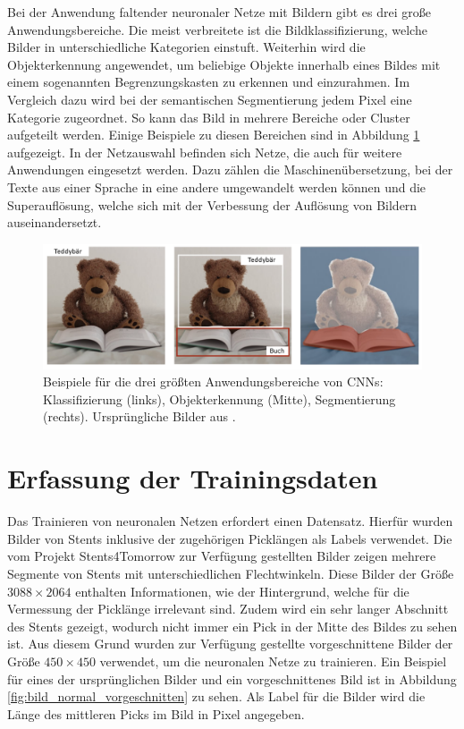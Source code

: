 \mypar Bei der Anwendung faltender neuronaler Netze mit Bildern gibt es drei große Anwendungsbereiche. Die meist verbreitete ist die Bildklassifizierung, welche Bilder in unterschiedliche Kategorien einstuft. Weiterhin wird die Objekterkennung angewendet, um beliebige Objekte innerhalb eines Bildes mit einem sogenannten Begrenzungskasten zu erkennen und einzurahmen. Im Vergleich dazu wird bei der semantischen Segmentierung jedem Pixel eine Kategorie zugeordnet. So kann das Bild in mehrere Bereiche oder Cluster aufgeteilt werden. Einige Beispiele zu diesen Bereichen sind in Abbildung \ref{fig:cnn-anwendungen} aufgezeigt. In der Netzauswahl befinden sich Netze, die auch für weitere Anwendungen eingesetzt werden. Dazu zählen die Maschinenübersetzung, bei der Texte aus einer Sprache in eine andere umgewandelt werden können und die Superauflösung, welche sich mit der Verbessung der Auflösung von Bildern auseinandersetzt.

\begin{figure}[h!]
\centering
\includegraphics[width=15cm]{98_images/cnn_anwendungen.png}
\caption{Beispiele für die drei größten Anwendungsbereiche von CNNs: Klassifizierung (links), Objekterkennung (Mitte), Segmentierung (rechts). Ursprüngliche Bilder aus \cite{amidi2018convolutional}.}
\label{fig:cnn-anwendungen}
\end{figure}


\section{Erfassung der Trainingsdaten}\label{sec:erfassung-trainingsdaten}
Das Trainieren von neuronalen Netzen erfordert einen Datensatz. Hierfür wurden Bilder von Stents inklusive der zugehörigen Picklängen als Labels verwendet. Die vom Projekt Stents4Tomorrow \cite{flechtmaschine} zur Verfügung gestellten Bilder zeigen mehrere Segmente von Stents mit unterschiedlichen Flechtwinkeln. Diese Bilder der Größe $3088 \times 2064$ enthalten Informationen, wie der Hintergrund, welche für die Vermessung der Picklänge irrelevant sind. Zudem wird ein sehr langer Abschnitt des Stents gezeigt, wodurch nicht immer ein Pick in der Mitte des Bildes zu sehen ist. Aus diesem Grund wurden zur Verfügung gestellte vorgeschnittene Bilder der Größe $450 \times 450$ verwendet, um die neuronalen Netze zu trainieren. Ein Beispiel für eines der ursprünglichen Bilder und ein vorgeschnittenes Bild ist in Abbildung \ref{fig:bild_normal_vorgeschnitten} zu sehen. Als Label für die Bilder wird die Länge des mittleren Picks im Bild in Pixel angegeben.

